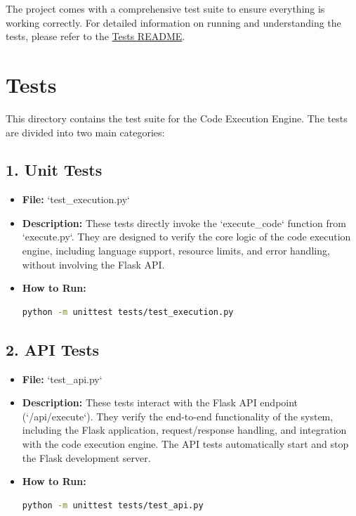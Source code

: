 \documentclass{article}
\begin{document}
The project comes with a comprehensive test suite to ensure everything is working correctly. For detailed information on running and understanding the tests, please refer to the \href{tests/README.md}{Tests README}.

\section*{Tests}

This directory contains the test suite for the Code Execution Engine. The tests are divided into two main categories:

\subsection*{1. Unit Tests}
\begin{itemize}
    \item \textbf{File:} `test\_execution.py`
    \item \textbf{Description:} These tests directly invoke the `execute\_code` function from `execute.py`. They are designed to verify the core logic of the code execution engine, including language support, resource limits, and error handling, without involving the Flask API.
    \item \textbf{How to Run:}
    \begin{lstlisting}[language=bash, caption=Run Unit Tests]
python -m unittest tests/test_execution.py
    \end{lstlisting}
\end{itemize}

\subsection*{2. API Tests}
\begin{itemize}
    \item \textbf{File:} `test\_api.py`
    \item \textbf{Description:} These tests interact with the Flask API endpoint (`/api/execute`). They verify the end-to-end functionality of the system, including the Flask application, request/response handling, and integration with the code execution engine. The API tests automatically start and stop the Flask development server.
    \item \textbf{How to Run:}
    \begin{lstlisting}[language=bash, caption=Run API Tests]
python -m unittest tests/test_api.py
    \end{lstlisting}
\end{itemize}
\end{document}
